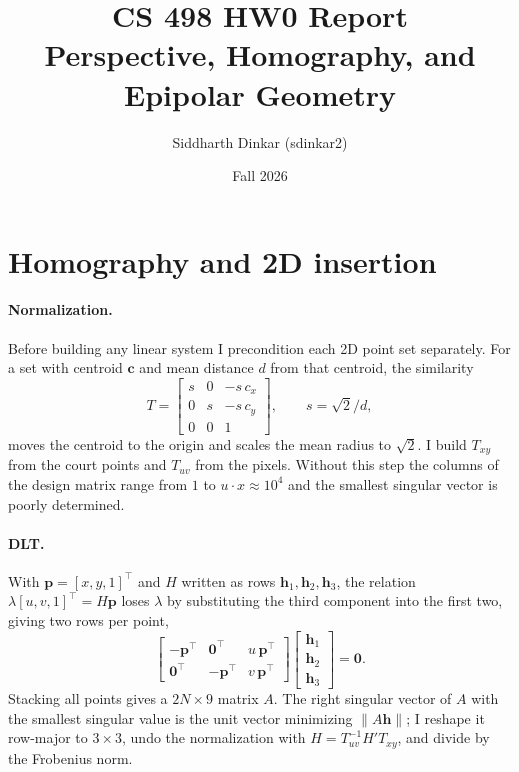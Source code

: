 \documentclass[11pt]{article}
\title{CS 498 HW0 Report\\Perspective, Homography, and Epipolar Geometry}
\author{Siddharth Dinkar (sdinkar2)}
\date{Fall 2026}
\begin{document}
\maketitle

\section{Homography and 2D insertion}

\paragraph{Normalization.} Before building any linear system I precondition each 2D point
set separately. For a set with centroid $\mathbf c$ and mean distance $d$ from
that centroid, the similarity
\[
T=\begin{bmatrix} s & 0 & -s\,c_x\\ 0 & s & -s\,c_y\\ 0 & 0 & 1\end{bmatrix},
\qquad s=\sqrt{2}/d ,
\]
moves the centroid to the origin and scales the mean radius to $\sqrt2$. I build
$T_{xy}$ from the court points and $T_{uv}$ from the pixels. Without this step
the columns of the design matrix range from $1$ to $u\cdot x\approx 10^4$ and the
smallest singular vector is poorly determined.

\paragraph{DLT.} With $\mathbf p=[x,y,1]^\top$ and $H$ written as rows
$\mathbf h_1,\mathbf h_2,\mathbf h_3$, the relation $\lambda[u,v,1]^\top=H\mathbf p$
loses $\lambda$ by substituting the third component into the first two, giving
two rows per point,
\[
\begin{bmatrix}-\mathbf p^\top & \mathbf 0^\top & u\,\mathbf p^\top\\
\mathbf 0^\top & -\mathbf p^\top & v\,\mathbf p^\top\end{bmatrix}
\begin{bmatrix}\mathbf h_1\\ \mathbf h_2\\ \mathbf h_3\end{bmatrix}=\mathbf 0 .
\]
Stacking all points gives a $2N\times 9$ matrix $A$. The right singular vector of
$A$ with the smallest singular value is the unit vector minimizing
$\|A\mathbf h\|$; I reshape it row-major to $3\times3$, undo the normalization
with $H=T_{uv}^{-1}H'T_{xy}$, and divide by the Frobenius norm.
\end{document}
